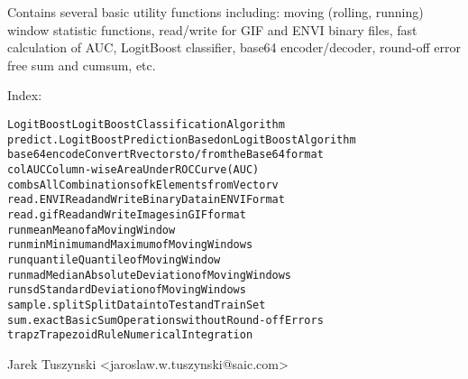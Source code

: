 \begin{Description}\relax
Contains several basic utility functions including: moving
(rolling, running) window statistic functions, read/write for
GIF and ENVI binary files, fast calculation of AUC, LogitBoost
classifier, base64 encoder/decoder, round-off error free sum
and cumsum, etc.
\end{Description}
\begin{Details}\relax
{}

Index:
\begin{alltt}
LogitBoost              LogitBoost Classification Algorithm
predict.LogitBoost      Prediction Based on LogitBoost Algorithm
base64encode            Convert R vectors to/from the Base64 format
colAUC                  Column-wise Area Under ROC Curve (AUC)
combs                   All Combinations of k Elements from Vector v
read.ENVI               Read and Write Binary Data in ENVI Format
read.gif                Read and Write Images in GIF format
runmean                 Mean of a Moving Window
runmin                  Minimum and Maximum of Moving Windows
runquantile             Quantile of Moving Window
runmad                  Median Absolute Deviation of Moving Windows
runsd                   Standard Deviation of Moving Windows
sample.split            Split Data into Test and Train Set
sum.exact               Basic Sum Operations without Round-off Errors
trapz                   Trapezoid Rule Numerical Integration
\end{alltt}
\end{Details}
\begin{Author}\relax
Jarek Tuszynski \textless{}jaroslaw.w.tuszynski@saic.com\textgreater{}
\end{Author}
